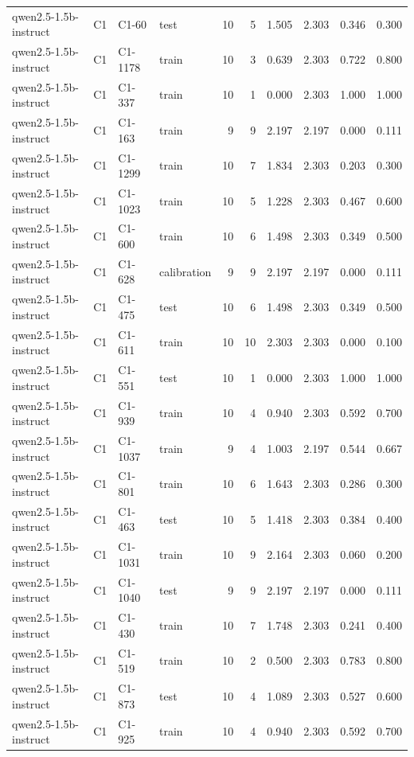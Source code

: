\begin{table}
\begin{tabular}{llllrrrrrr}
qwen2.5-1.5b-instruct & C1 & C1-60 & test & 10 & 5 & 1.505 & 2.303 & 0.346 & 0.300 \\
qwen2.5-1.5b-instruct & C1 & C1-1178 & train & 10 & 3 & 0.639 & 2.303 & 0.722 & 0.800 \\
qwen2.5-1.5b-instruct & C1 & C1-337 & train & 10 & 1 & 0.000 & 2.303 & 1.000 & 1.000 \\
qwen2.5-1.5b-instruct & C1 & C1-163 & train & 9 & 9 & 2.197 & 2.197 & 0.000 & 0.111 \\
qwen2.5-1.5b-instruct & C1 & C1-1299 & train & 10 & 7 & 1.834 & 2.303 & 0.203 & 0.300 \\
qwen2.5-1.5b-instruct & C1 & C1-1023 & train & 10 & 5 & 1.228 & 2.303 & 0.467 & 0.600 \\
qwen2.5-1.5b-instruct & C1 & C1-600 & train & 10 & 6 & 1.498 & 2.303 & 0.349 & 0.500 \\
qwen2.5-1.5b-instruct & C1 & C1-628 & calibration & 9 & 9 & 2.197 & 2.197 & 0.000 & 0.111 \\
qwen2.5-1.5b-instruct & C1 & C1-475 & test & 10 & 6 & 1.498 & 2.303 & 0.349 & 0.500 \\
qwen2.5-1.5b-instruct & C1 & C1-611 & train & 10 & 10 & 2.303 & 2.303 & 0.000 & 0.100 \\
qwen2.5-1.5b-instruct & C1 & C1-551 & test & 10 & 1 & 0.000 & 2.303 & 1.000 & 1.000 \\
qwen2.5-1.5b-instruct & C1 & C1-939 & train & 10 & 4 & 0.940 & 2.303 & 0.592 & 0.700 \\
qwen2.5-1.5b-instruct & C1 & C1-1037 & train & 9 & 4 & 1.003 & 2.197 & 0.544 & 0.667 \\
qwen2.5-1.5b-instruct & C1 & C1-801 & train & 10 & 6 & 1.643 & 2.303 & 0.286 & 0.300 \\
qwen2.5-1.5b-instruct & C1 & C1-463 & test & 10 & 5 & 1.418 & 2.303 & 0.384 & 0.400 \\
qwen2.5-1.5b-instruct & C1 & C1-1031 & train & 10 & 9 & 2.164 & 2.303 & 0.060 & 0.200 \\
qwen2.5-1.5b-instruct & C1 & C1-1040 & test & 9 & 9 & 2.197 & 2.197 & 0.000 & 0.111 \\
qwen2.5-1.5b-instruct & C1 & C1-430 & train & 10 & 7 & 1.748 & 2.303 & 0.241 & 0.400 \\
qwen2.5-1.5b-instruct & C1 & C1-519 & train & 10 & 2 & 0.500 & 2.303 & 0.783 & 0.800 \\
qwen2.5-1.5b-instruct & C1 & C1-873 & test & 10 & 4 & 1.089 & 2.303 & 0.527 & 0.600 \\
qwen2.5-1.5b-instruct & C1 & C1-925 & train & 10 & 4 & 0.940 & 2.303 & 0.592 & 0.700 \\

\end{tabular}
\end{table}
